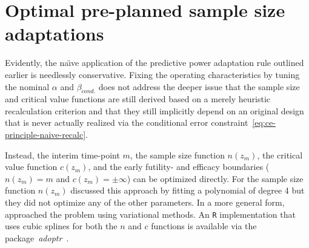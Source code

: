 \documentclass[12pt]{article}
\begin{document}
\section{Optimal pre-planned sample size adaptations}
\label{sec:optimal-adaptation}

Evidently, the na\"{\i}ve application of the predictive power
adaptation rule outlined earlier is needlessly conservative.
Fixing the operating characteristics by tuning the nominal $\alpha$ and
$\beta_{cond.}$ does not address the deeper issue that the sample size and
critical value functions are still derived based on a merely heuristic recalculation criterion and that
they still implicitly depend on an original design that is never actually realized via the
conditional error constraint~\eqref{eq:ce-principle-naive-recalc}.

Instead, the interim time-point $m$,
the sample size function $n(z_m)$,
the critical value function $c(z_m)$,
and the early futility- and efficacy boundaries
($n(z_m)=m$ and $ c(z_m)=\pm\infty$)
can be optimized directly.
For the sample size function $n(z_m)$ \cite{brannath2004} discussed this approach by fitting a polynomial of degree 4 but they did not optimize
any of the other parameters.
In a more general form, \cite{pilz2019} approached the problem using
variational methods.
An \texttt{R} implementation that uses cubic splines for both the $n$ and
$c$ functions is available via the package~\textit{adoptr}~\cite{adoptrjss2020}.
\end{document}

